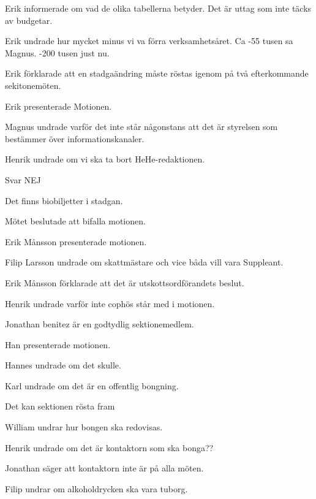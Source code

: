 \documentclass[10pt]{article}
\begin{document}
\begin{paragrafer}

	Erik informerade om vad de olika tabellerna betyder. Det är uttag som inte täcks av budgetar.


Erik undrade hur mycket minus vi va förra verksamhetsåret. Ca -55 tusen sa Magnus. -200 tusen just nu.

    \begin{paragrafer}

		Erik förklarade att en stadgaändring måste röstas igenom på två efterkommande sekitonemöten.

		Erik presenterade Motionen. 

		Magnus undrade varför det inte står någonstans att det är styrelsen som bestämmer över informationskanaler. 

		Henrik undrade om vi ska ta bort HeHe-redaktionen.

		Svar NEJ

		Det finns biobiljetter i stadgan.

		Mötet beslutade att bifalla motionen.

		
		Erik Månsson presenterade motionen.

		Filip Larsson undrade om skattmästare och vice båda vill vara Suppleant. 

		Erik Månsson förklarade att det är utskottsordförandets beslut.

		Henrik undrade varför inte cophös står med i motionen. 


		Jonathan benitez är en godtydlig sektionemedlem. 

		Han presenterade motionen.

		Hannes undrade om det skulle.

		Karl undrade om det är en offentlig bongning.

		Det kan sektionen rösta fram
		
		William undrar hur bongen ska redovisas. 

		Henrik undrade om det är kontaktorn som ska bonga??

		Jonathan säger att kontaktorn inte är på alla möten.

		Filip undrar om alkoholdrycken ska vara tuborg. 


\end{paragrafer}
\end{paragrafer}
\end{document}
